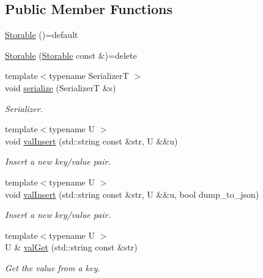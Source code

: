 \subsection*{Public Member Functions}
\begin{DoxyCompactItemize}
\item 
\hyperlink{structvt_1_1vrt_1_1collection_1_1storage_1_1_storable_aa6cb609d17c3fffd1416842cf9cc27e9}{Storable} ()=default
\item 
\hyperlink{structvt_1_1vrt_1_1collection_1_1storage_1_1_storable_a5a3e15eefa62b57645c73b06a0ffcbea}{Storable} (\hyperlink{structvt_1_1vrt_1_1collection_1_1storage_1_1_storable}{Storable} const \&)=delete
\item 
{\footnotesize template$<$typename SerializerT $>$ }\\void \hyperlink{structvt_1_1vrt_1_1collection_1_1storage_1_1_storable_a9fac390a50e3de2776afb730dd3c0418}{serialize} (SerializerT \&s)
\begin{DoxyCompactList}\small\item\em Serializer. \end{DoxyCompactList}\item 
{\footnotesize template$<$typename U $>$ }\\void \hyperlink{structvt_1_1vrt_1_1collection_1_1storage_1_1_storable_a8c0cbce1b3e261dd375d431a56a7c350}{val\+Insert} (std\+::string const \&str, U \&\&u)
\begin{DoxyCompactList}\small\item\em Insert a new key/value pair. \end{DoxyCompactList}\item 
{\footnotesize template$<$typename U $>$ }\\void \hyperlink{structvt_1_1vrt_1_1collection_1_1storage_1_1_storable_a7c4652c490f753648bedf483bcb3f75d}{val\+Insert} (std\+::string const \&str, U \&\&u, bool dump\+\_\+to\+\_\+json)
\begin{DoxyCompactList}\small\item\em Insert a new key/value pair. \end{DoxyCompactList}\item 
{\footnotesize template$<$typename U $>$ }\\U \& \hyperlink{structvt_1_1vrt_1_1collection_1_1storage_1_1_storable_a81a60463dff73c6375422344c8eb410c}{val\+Get} (std\+::string const \&str)
\begin{DoxyCompactList}\small\item\em Get the value from a key. \end{DoxyCompactList}\item 

\end{DoxyCompactItemize}
